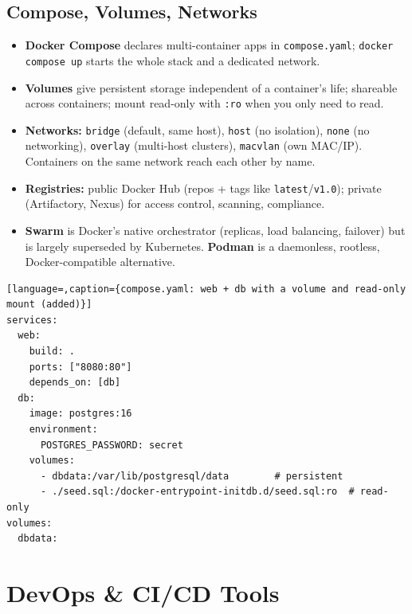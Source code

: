 \documentclass[hidelinks]{article}
\begin{document}
\subsection{Compose, Volumes, Networks}
\begin{itemize}
  \item \textbf{Docker Compose} declares multi-container apps in \texttt{compose.yaml};
        \texttt{docker compose up} starts the whole stack and a dedicated network.
  \item \textbf{Volumes} give persistent storage independent of a container's life; shareable
        across containers; mount read-only with \texttt{:ro} when you only need to read.
  \item \textbf{Networks:} \texttt{bridge} (default, same host), \texttt{host} (no isolation),
        \texttt{none} (no networking), \texttt{overlay} (multi-host clusters), \texttt{macvlan}
        (own MAC/IP). Containers on the same network reach each other by name.
  \item \textbf{Registries:} public Docker Hub (repos + tags like \texttt{latest}/\texttt{v1.0});
        private (Artifactory, Nexus) for access control, scanning, compliance.
  \item \textbf{Swarm} is Docker's native orchestrator (replicas, load balancing, failover) but is
        largely superseded by Kubernetes. \textbf{Podman} is a daemonless, rootless,
        Docker-compatible alternative.
\end{itemize}

\begin{lstlisting}[language=,caption={compose.yaml: web + db with a volume and read-only mount (added)}]
services:
  web:
    build: .
    ports: ["8080:80"]
    depends_on: [db]
  db:
    image: postgres:16
    environment:
      POSTGRES_PASSWORD: secret
    volumes:
      - dbdata:/var/lib/postgresql/data        # persistent
      - ./seed.sql:/docker-entrypoint-initdb.d/seed.sql:ro  # read-only
volumes:
  dbdata:
\end{lstlisting}

\section{DevOps \& CI/CD Tools}
\end{document}
